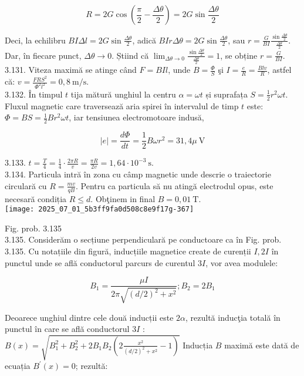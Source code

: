 $$
R=2 G \cos \left(\frac{\pi}{2}-\frac{\Delta \theta}{2}\right)=2 G \sin \frac{\Delta \theta}{2}
$$

Deci, la echilibru $B I \Delta l=2 G \sin \frac{\Delta \theta}{2}$, adică $B I r \Delta \theta=2 G \sin \frac{\Delta \theta}{2}$, sau $r=\frac{G}{B I} \frac{\sin \frac{\Delta \theta}{2}}{\frac{\Delta \theta}{2}}$.\\
Dar, în fiecare punct, $\Delta \theta \rightarrow 0$. Știind că $\lim _{\Delta \theta \rightarrow 0} \frac{\sin \frac{\Delta \theta}{2}}{\frac{\Delta \theta}{2}}=1$, se obține $r=\frac{G}{B I}$.\\
3.131. Viteza maximă se atinge când $F=B I l$, unde $B=\frac{\Phi}{S}$ şi $I=\frac{e}{R}=\frac{B l v}{R}$, astfel că: $v=\frac{F R S^{2}}{\Phi^{2} l^{2}}=0,8 \mathrm{~m} / \mathrm{s}$.\\
3.132. În timpul $t$ tija mătură unghiul la centru $\alpha=\omega t$ și suprafața $S=\frac{1}{2} r^{2} \omega t$. Fluxul magnetic care traversează aria spirei în intervalul de timp $t$ este: $\Phi=B S=\frac{1}{2} B r^{2} \omega t$, iar tensiunea electromotoare indusă,

$$
|e|=\frac{d \Phi}{d t}=\frac{1}{2} B \omega r^{2}=31,4 \mu \mathrm{~V}
$$

3.133. $t=\frac{T}{4}=\frac{1}{4} \cdot \frac{2 \pi R}{v}=\frac{\pi R}{2 v}=1,64 \cdot 10^{-3} \mathrm{~s}$.\\
3.134. Particula intră în zona cu câmp magnetic unde descrie o traiectorie circulară cu $R=\frac{m v}{q B}$. Pentru ca particula să nu atingă electrodul opus, este necesară condiția $R \leq d$. Obţinem in final $B=0,01 \mathrm{~T}$.\\
\texttt{[image: 2025\_07\_01\_5b3ff9fa0d508c8e9f17g-367]}

Fig. prob. 3.135\\
3.135. Considerăm o secțiune perpendiculară pe conductoare ca în Fig. prob. 3.135. Cu notațiile din figură, inducțiile magnetice create de curenții $I, 2 I$ în punctul unde se află conductorul parcurs de curentul $3 I$, vor avea modulele:

$$
B_{1}=\frac{\mu I}{2 \pi \sqrt{(d / 2)^{2}+x^{2}}} ; B_{2}=2 B_{1}
$$

Deoarece unghiul dintre cele două inducții este $2 \alpha$, rezultă inducţia totală în punctul în care se află conductorul $3 I$ :\\
$B(x)=\sqrt{B_{1}^{2}+B_{2}^{2}+2 B_{1} B_{2}\left(2 \frac{x^{2}}{(d / 2)^{2}+x^{2}}-1\right)}$ Inducția $B$ maximă este dată de ecuația $B^{\prime}(x)=0$; rezultă:

